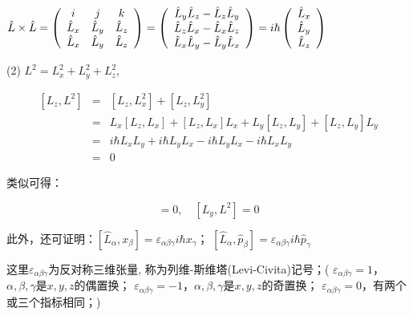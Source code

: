 $\hat L \times \hat L = \left( {\begin{array}{*{20}c}
   i & j & k  \\
   {\hat L_x } & {\hat L_y } & {\hat L_z }  \\
   {\hat L_x } & {\hat L_y } & {\hat L_z }  \\
\end{array}} \right) = \left( {\begin{array}{*{20}c}
   {\hat L_y \hat L_z  - \hat L_z \hat L_y }  \\
   {\hat L_z \hat L_x  - \hat L_x \hat L_z }  \\
   {\hat L_x \hat L_y  - \hat L_y \hat L_x }  \\
\end{array}} \right) = i \hbar \left( {\begin{array}{*{20}c}
   {\hat L_x }  \\
   {\hat L_y }  \\
   {\hat L_z }  \\
\end{array}} \right)$

(2) $L^2 = L_x^2 + L_y^2 + L_z^2$,

\begin{eqnarray*}
  [L_z, L^2] &=& [L_z, L_x^2]+[L_z,
L_y^2] \\
  {} &=& L_x[L_z,L_x]+[L_z,L_x]L_x+L_y[L_z, L_y]+[L_z,L_y]L_y \\
  {} &=& i\hbar L_xL_y + i\hbar L_y L_x -i\hbar L_y L_x - i\hbar L_x
  L_y \\
  {} &=& 0
\end{eqnarray*}

类似可得：

\begin{equation*}
[L_x, L^2] = 0 , \quad [L_y, L^2] = 0  
\end{equation*}


此外，还可证明：$\left[ {\hat L_\alpha  ,x_\beta  } \right] = \varepsilon _{\alpha \beta \gamma } i\hbar x_\gamma  $；
$\left[ {\hat L_\alpha  ,\hat p_\beta  } \right] = \varepsilon _{\alpha \beta \gamma } i\hbar \hat p_\gamma  $

这里$\varepsilon _{\alpha \beta \gamma } $为反对称三维张量,
称为列维-斯维塔(Levi-Civita)记号；( $\varepsilon _{\alpha \beta
\gamma }  = 1$，$\alpha ,\beta ,\gamma $是$x,y,z$的偶置换；
$\varepsilon _{\alpha \beta \gamma }  = - 1$，$\alpha ,\beta ,\gamma
$是$x,y,z$的奇置换； $\varepsilon _{\alpha \beta \gamma }  =
0$，有两个或三个指标相同；)

